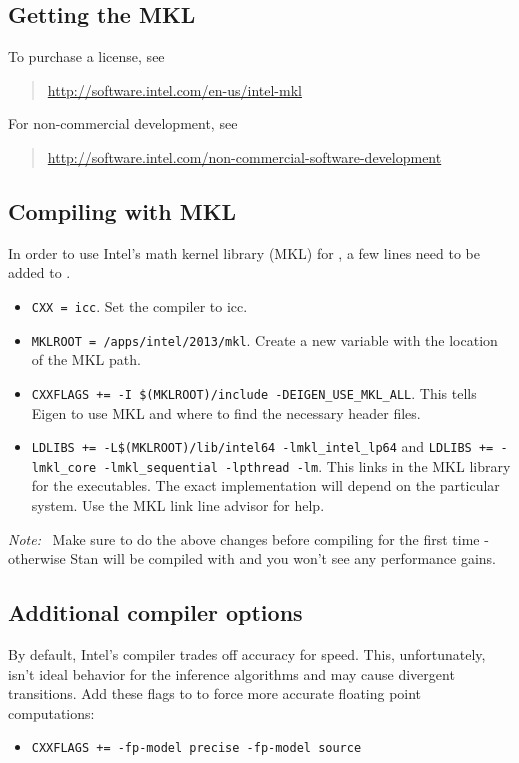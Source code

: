 \subsection{Getting the MKL}

To purchase a license, see
%
\begin{quote}
\url{http://software.intel.com/en-us/intel-mkl}
\end{quote}
%
For non-commercial development, see
%
\begin{quote}\small
\url{http://software.intel.com/non-commercial-software-development}
\end{quote}

\subsection{Compiling with MKL}

In order to use Intel's math kernel library (MKL) for \Cpp, a few
lines need to be added to . 
\begin{itemize}
  \item \Verb|CXX = icc|. Set the compiler to icc.
  \item \Verb|MKLROOT = /apps/intel/2013/mkl|. Create a new variable
    with the location of the MKL path.
  \item
    \Verb|CXXFLAGS += -I $(MKLROOT)/include -DEIGEN_USE_MKL_ALL|. This
    tells Eigen to use MKL and where to find the necessary header
    files.
  \item \Verb|LDLIBS += -L$(MKLROOT)/lib/intel64 -lmkl_intel_lp64| and
    \Verb|LDLIBS += -lmkl_core -lmkl_sequential -lpthread -lm|. This
    links in the MKL library for the \CmdStan executables. The exact
    implementation will depend on the particular system. Use the MKL
    link line advisor for help.
\end{itemize}
%
{\it Note:} \ Make sure to do the above changes before compiling for the first
time - otherwise Stan will be compiled with  and you won't see any
performance gains.

\subsection{Additional compiler options}

By default, Intel's compiler trades off accuracy for speed. This,
unfortunately, isn't ideal behavior for the inference algorithms
and may cause divergent transitions. Add these flags to 
to force more accurate floating point computations:
\begin{itemize}
  \item \Verb|CXXFLAGS += -fp-model precise -fp-model source|
\end{itemize}


